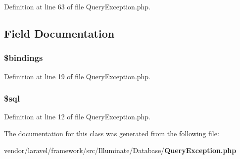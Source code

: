 Definition at line 63 of file Query\+Exception.\+php.



\subsection{Field Documentation}
\subsubsection[{\$bindings}]{\setlength{\rightskip}{0pt plus 5cm}\$bindings\hspace{0.3cm}{\ttfamily [protected]}}\label{class_illuminate_1_1_database_1_1_query_exception_adacdcea57647569304169243ff32cd10}


Definition at line 19 of file Query\+Exception.\+php.

\subsubsection[{\$sql}]{\setlength{\rightskip}{0pt plus 5cm}\$sql\hspace{0.3cm}{\ttfamily [protected]}}\label{class_illuminate_1_1_database_1_1_query_exception_a047170d6020a882807665812a27e2525}


Definition at line 12 of file Query\+Exception.\+php.



The documentation for this class was generated from the following file\+:\begin{DoxyCompactItemize}
\item 
vendor/laravel/framework/src/\+Illuminate/\+Database/{\bf Query\+Exception.\+php}\end{DoxyCompactItemize}
